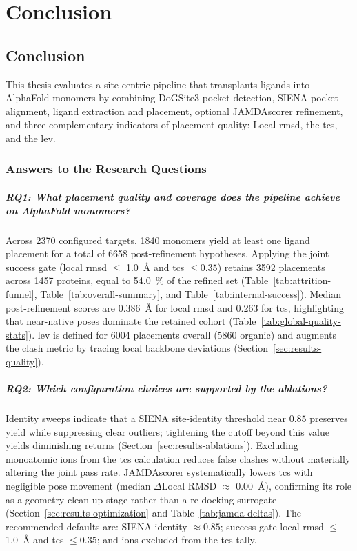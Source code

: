 \chapter{Conclusion}
\label{chap:conclusion}

\section{Conclusion}
This thesis evaluates a site-centric pipeline that transplants ligands into AlphaFold monomers by combining DoGSite3 pocket detection, SIENA pocket alignment, ligand extraction and placement, optional JAMDAscorer refinement, and three complementary indicators of placement quality: Local \gls{rmsd}, the \gls{tcs}, and the \gls{lev}.

\subsection*{Answers to the Research Questions}
\paragraph{RQ1: What placement quality and coverage does the pipeline achieve on AlphaFold monomers?} Across \num{2370} configured targets, \num{1840} monomers yield at least one ligand placement for a total of \num{6658} post-refinement hypotheses. Applying the joint success gate (local \gls{rmsd} $\leq$ \SI{1.0}{\angstrom} and \gls{tcs} $\leq 0.35$) retains \num{3592} placements across \num{1457} proteins, equal to \SI{54.0}{\percent} of the refined set (Table~\ref{tab:attrition-funnel}, Table~\ref{tab:overall-summary}, and Table~\ref{tab:internal-success}). Median post-refinement scores are \SI{0.386}{\angstrom} for local \gls{rmsd} and 0.263 for \gls{tcs}, highlighting that near-native poses dominate the retained cohort (Table~\ref{tab:global-quality-stats}). \gls{lev} is defined for \num{6004} placements overall (\num{5860} organic) and augments the clash metric by tracing local backbone deviations (Section~\ref{sec:results-quality}).

\paragraph{RQ2: Which configuration choices are supported by the ablations?} Identity sweeps indicate that a SIENA site-identity threshold near $0.85$ preserves yield while suppressing clear outliers; tightening the cutoff beyond this value yields diminishing returns (Section~\ref{sec:results-ablations}). Excluding monoatomic ions from the \gls{tcs} calculation reduces false clashes without materially altering the joint pass rate. JAMDAscorer systematically lowers \gls{tcs} with negligible pose movement (median $\Delta$Local RMSD $\approx$ \SI{0.00}{\angstrom}), confirming its role as a geometry clean-up stage rather than a re-docking surrogate (Section~\ref{sec:results-optimization} and Table~\ref{tab:jamda-deltas}). The recommended defaults are: SIENA identity $\approx 0.85$; success gate local \gls{rmsd} $\leq$ \SI{1.0}{\angstrom} and \gls{tcs} $\leq 0.35$; and ions excluded from the \gls{tcs} tally.

